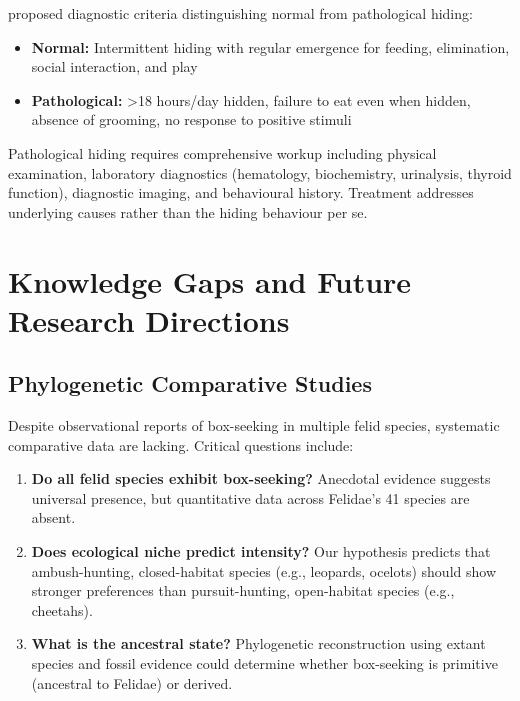 \documentclass[12pt,a4paper]{article}
\begin{document}
\citet{amat2016} proposed diagnostic criteria distinguishing normal from pathological hiding:

\begin{itemize}
    \item \textbf{Normal:} Intermittent hiding with regular emergence for feeding, elimination, social interaction, and play
    \item \textbf{Pathological:} >18 hours/day hidden, failure to eat even when hidden, absence of grooming, no response to positive stimuli
\end{itemize}

Pathological hiding requires comprehensive workup including physical examination, laboratory diagnostics (hematology, biochemistry, urinalysis, thyroid function), diagnostic imaging, and behavioural history. Treatment addresses underlying causes rather than the hiding behaviour per se.

\section{Knowledge Gaps and Future Research Directions}

\subsection{Phylogenetic Comparative Studies}

Despite observational reports of box-seeking in multiple felid species, systematic comparative data are lacking. Critical questions include:

\begin{enumerate}
    \item \textbf{Do all felid species exhibit box-seeking?} Anecdotal evidence suggests universal presence, but quantitative data across Felidae's 41 species are absent.
    
    \item \textbf{Does ecological niche predict intensity?} Our hypothesis predicts that ambush-hunting, closed-habitat species (e.g., leopards, ocelots) should show stronger preferences than pursuit-hunting, open-habitat species (e.g., cheetahs).
    
    \item \textbf{What is the ancestral state?} Phylogenetic reconstruction using extant species and fossil evidence could determine whether box-seeking is primitive (ancestral to Felidae) or derived.
\end{enumerate}
\end{document}
